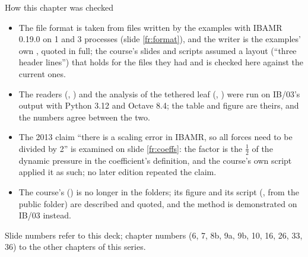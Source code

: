 \documentclass[aspectratio=169,11pt]{beamer}
\begin{document}
\begin{frame}{How this chapter was checked}
\label{fr:checked}
\begin{itemize}\footnotesize
  \item The file format is taken from files written by the examples with IBAMR 0.19.0 on 1 and 3 processes (slide \ref{fr:format}), and the writer is the examples' own , quoted in full; the course's slides and scripts assumed a layout (``three header lines'') that holds for the files they had and is checked here against the current ones.
  \item The readers (, ) and the analysis of the tethered leaf (, ) were run on IB/03's output with Python 3.12 and Octave 8.4; the table and figure are theirs, and the numbers agree between the two.
  \item The 2013 claim ``there is a scaling error in IBAMR, so all forces need to be divided by 2'' is examined on slide \ref{fr:coeffs}: the factor is the $\frac12$ of the dynamic pressure in the coefficient's definition, and the course's own script applied it as such; no later edition repeated the claim.
  \item The course's  () is no longer in the folders; its figure and its script (, from the public  folder) are described and quoted, and the method is demonstrated on IB/03 instead.
\end{itemize}
\begin{punchbox}
\footnotesize Slide numbers refer to this deck; chapter numbers (6, 7, 8b, 9a, 9b, 10, 16, 26, 33, 36) to the other chapters of this series.
\end{punchbox}
\end{frame}
\end{document}
